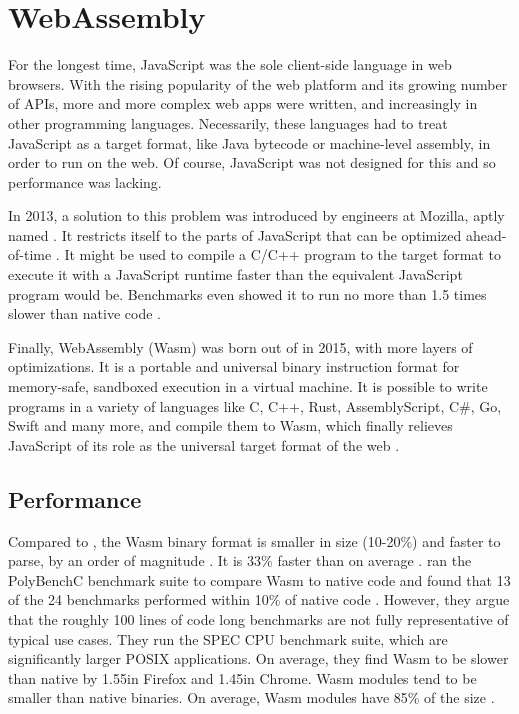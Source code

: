 \section{WebAssembly}

For the longest time, JavaScript was the sole client-side language in web browsers. With the rising popularity of the web platform and its growing number of APIs, more and more complex web apps were written, and increasingly in other programming languages. Necessarily, these languages had to treat JavaScript as a target format, like Java bytecode or machine-level assembly, in order to run on the web. Of course, JavaScript was not designed for this and so performance was lacking.

In 2013, a solution to this problem was introduced by engineers at Mozilla, aptly named . It restricts itself to the parts of JavaScript that can be optimized ahead-of-time \cite{Herman2014}. It might be used to compile a C/C++ program to the  target format to execute it with a JavaScript runtime faster than the equivalent JavaScript program would be. Benchmarks even showed it to run no more than 1.5 times slower than native code \cite{Zakai2013}.

Finally, WebAssembly (Wasm) was born out of  in 2015, with more layers of optimizations. It is a portable and universal binary instruction format for memory-safe, sandboxed execution in a virtual machine.
It is possible to write programs in a variety of languages like C, C++, Rust, AssemblyScript, C\#, Go, Swift and many more, and compile them to Wasm, which finally relieves JavaScript of its role as the universal target format of the web \cite{W3C2020}.

\subsection{Performance}

Compared to , the Wasm binary format is smaller in size (10-20\%) and faster to parse, by an order of magnitude
\cite{Clark2019}. It is 33\% faster than  on average \cite{Haas2017}.
\citeauthor{NotSoFast} ran the PolyBenchC benchmark suite to compare Wasm to native code and found that 13 of the 24 benchmarks performed within 10\% of native code \cite{NotSoFast}. However, they argue that the roughly 100 lines of code long benchmarks are not fully representative of typical use cases. They run the SPEC CPU benchmark suite, which are significantly larger POSIX applications. On average, they find Wasm to be slower than native by 1.55\times in Firefox and 1.45\times in Chrome.
Wasm modules tend to be smaller than native  binaries. On average, Wasm modules have 85\% of the size \cite{Haas2017}.

